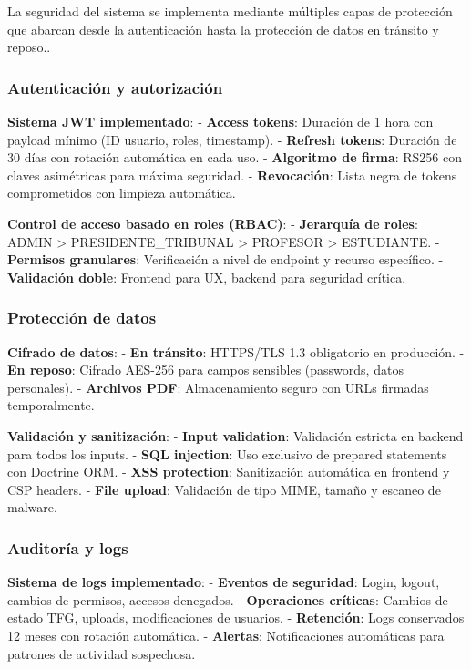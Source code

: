 \documentclass[12pt,a4paper,oneside]{report}
\begin{document}
La seguridad del sistema se implementa mediante múltiples capas de
protección que abarcan desde la autenticación hasta la protección de
datos en tránsito y reposo..

\subsubsection{Autenticación y
autorización}\label{autenticaciuxf3n-y-autorizaciuxf3n}

\textbf{Sistema JWT implementado}: - \textbf{Access tokens}: Duración de
1 hora con payload mínimo (ID usuario, roles, timestamp). -
\textbf{Refresh tokens}: Duración de 30 días con rotación automática en
cada uso. - \textbf{Algoritmo de firma}: RS256 con claves asimétricas
para máxima seguridad. - \textbf{Revocación}: Lista negra de tokens
comprometidos con limpieza automática.

\textbf{Control de acceso basado en roles (RBAC)}: - \textbf{Jerarquía
de roles}: ADMIN \textgreater{} PRESIDENTE\_TRIBUNAL \textgreater{}
PROFESOR \textgreater{} ESTUDIANTE. - \textbf{Permisos granulares}:
Verificación a nivel de endpoint y recurso específico. -
\textbf{Validación doble}: Frontend para UX, backend para seguridad
crítica.

\subsubsection{Protección de datos}\label{protecciuxf3n-de-datos}

\textbf{Cifrado de datos}: - \textbf{En tránsito}: HTTPS/TLS 1.3
obligatorio en producción. - \textbf{En reposo}: Cifrado AES-256 para
campos sensibles (passwords, datos personales). - \textbf{Archivos PDF}:
Almacenamiento seguro con URLs firmadas temporalmente.

\textbf{Validación y sanitización}: - \textbf{Input validation}:
Validación estricta en backend para todos los inputs. - \textbf{SQL
injection}: Uso exclusivo de prepared statements con Doctrine ORM. -
\textbf{XSS protection}: Sanitización automática en frontend y CSP
headers. - \textbf{File upload}: Validación de tipo MIME, tamaño y
escaneo de malware.

\subsubsection{Auditoría y logs}\label{auditoruxeda-y-logs}

\textbf{Sistema de logs implementado}: - \textbf{Eventos de seguridad}:
Login, logout, cambios de permisos, accesos denegados. -
\textbf{Operaciones críticas}: Cambios de estado TFG, uploads,
modificaciones de usuarios. - \textbf{Retención}: Logs conservados 12
meses con rotación automática. - \textbf{Alertas}: Notificaciones
automáticas para patrones de actividad sospechosa.
\end{document}
